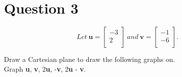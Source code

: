 \documentclass{report}
\begin{document}
\clearpage
\section*{Question 3}

\begin{mybox}
\begin{equation*}
Let \: \mathbf{u}=\begin{bmatrix} -3 \\ 2 \\ \end{bmatrix} \: and \: \mathbf{v}=\begin{bmatrix} -1 \\ -6 \\  \end{bmatrix}.
\end{equation*}
\begin{center}
Draw a Cartesian plane to draw the following graphs on.\\ Graph \textbf{u}, \textbf{v}, 2\textbf{u}, -\textbf{v}, 2\textbf{u} - \textbf{v}.
\end{center}
\end{mybox}
\end{document}
